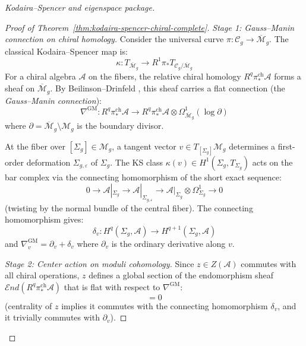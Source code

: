 \begin{proof}[Kodaira--Spencer and eigenspace package]
\begin{proof}[Proof of Theorem~\ref{thm:kodaira-spencer-chiral-complete}]
\emph{Stage 1: Gauss--Manin connection on chiral homology.}
Consider the universal curve $\pi: \mathcal{C}_g \to \overline{\mathcal{M}}_g$.
The classical Kodaira--Spencer map is:
\begin{equation}
\kappa: T_{\overline{\mathcal{M}}_g} \to R^1\pi_* T_{\mathcal{C}_g/\overline{\mathcal{M}}_g}
\end{equation}
For a chiral algebra $\mathcal{A}$ on the fibers, the relative chiral homology
$R^q\pi_*^{\mathrm{ch}} \mathcal{A}$ forms a sheaf on $\overline{\mathcal{M}}_g$.
By Beilinson--Drinfeld \cite[Theorem 4.6.1]{BD04}, this sheaf carries a flat
connection (the \emph{Gauss--Manin connection}):
\begin{equation}
\nabla^{\mathrm{GM}}: R^q\pi_*^{\mathrm{ch}} \mathcal{A} \to
R^q\pi_*^{\mathrm{ch}} \mathcal{A} \otimes \Omega^1_{\overline{\mathcal{M}}_g}(\log \partial)
\end{equation}
where $\partial = \overline{\mathcal{M}}_g \setminus \mathcal{M}_g$ is the boundary
divisor.

At the fiber over $[\Sigma_g] \in \mathcal{M}_g$, a tangent vector $v \in
T_{[\Sigma_g]}\mathcal{M}_g$ determines a first-order deformation $\Sigma_{g,\varepsilon}$
of $\Sigma_g$. The KS class $\kappa(v) \in H^1(\Sigma_g, T_{\Sigma_g})$ acts on the
bar complex via the connecting homomorphism of the short exact sequence:
\begin{equation}
0 \to \mathcal{A}|_{\Sigma_g} \to \mathcal{A}|_{\Sigma_{g,\varepsilon}} \to
\mathcal{A}|_{\Sigma_g} \otimes \Omega^1_{\Sigma_g} \to 0
\end{equation}
(twisting by the normal bundle of the central fiber). The connecting homomorphism gives:
\begin{equation}
\delta_v: H^q(\Sigma_g, \mathcal{A}) \to H^{q+1}(\Sigma_g, \mathcal{A})
\end{equation}
and $\nabla_v^{\mathrm{GM}} = \partial_v + \delta_v$ where $\partial_v$ is the
ordinary derivative along $v$.

\emph{Stage 2: Center action on moduli cohomology.}
Since $z \in Z(\mathcal{A})$ commutes with all chiral operations, $z$ defines a
global section of the endomorphism sheaf
$\mathcal{E}nd(R^q\pi_*^{\mathrm{ch}}\mathcal{A})$ that is flat with respect to
$\nabla^{\mathrm{GM}}$:
\begin{equation}
[\nabla^{\mathrm{GM}}, \rho(z)] = 0
\end{equation}
(centrality of $z$ implies it commutes with the connecting homomorphism $\delta_v$,
and it trivially commutes with $\partial_v$).


\end{proof}
\end{proof}
